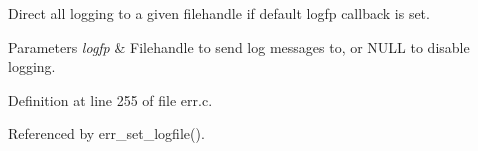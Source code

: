 Direct all logging to a given filehandle if default logfp callback is set. 


\begin{DoxyParams}{Parameters}
{\em logfp} & Filehandle to send log messages to, or N\+U\+L\+L to disable logging. \\
\hline
\end{DoxyParams}


Definition at line 255 of file err.\+c.



Referenced by err\+\_\+set\+\_\+logfile().

